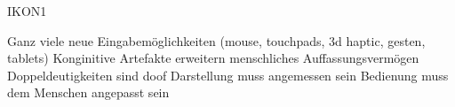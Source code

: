 \documentclass[12pt]{article}
\begin{document}
IKON1

Ganz viele neue Eingabemöglichkeiten (mouse, touchpads, 3d haptic, gesten, tablets)
Konginitive Artefakte erweitern menschliches Auffassungsvermögen
Doppeldeutigkeiten sind doof
Darstellung muss angemessen sein
Bedienung muss dem Menschen angepasst sein
\end{document}
